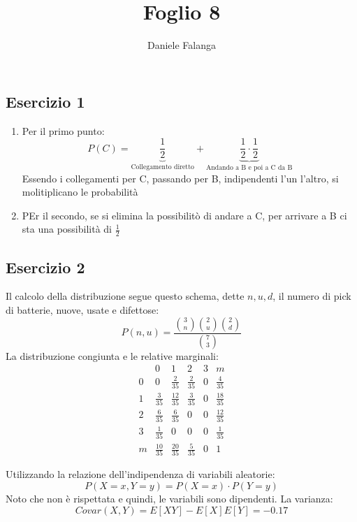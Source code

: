 \documentclass[12pt]{article}
\title{\textbf{Foglio 8}}
\author{Daniele Falanga}
\date{}
\begin{document}
\maketitle

\subsection*{Esercizio 1}

\begin{enumerate}
    \item Per il primo punto:
    \[
    P(C) = \underbrace{\frac{1}{2}}_{\text{Collegamento diretto}} + \underbrace{\frac{1}{2} \cdot \frac{1}{2}}_{\text{Andando a B e poi a C da B}}    
    \]
    Essendo i collegamenti per C, passando per B, indipendenti l'un l'altro, si molitiplicano le probabilità
    \item PEr il secondo, se si elimina la possibilitò di andare a C, per arrivare a B ci sta una possibilità di \(\frac{1}{2}\)
\end{enumerate}

\newpage
\subsection*{Esercizio 2}
Il calcolo della distribuzione segue questo schema, dette \(n,u,d\), il numero di pick di batterie, nuove, usate e difettose:
\[
P(n,u) = \frac{\binom{3}{n} \binom{2}{u} \binom{2}{d}}{\binom{7}{3}}    
\]
La distribuzione congiunta e le relative marginali:
\begin{equation*}
    \renewcommand{\arraystretch}{1.5}
    \begin{array}{c|cccc|c}
          & 0 & 1 & 2 & 3 & m\\
    \hline
    0 & 0 & \frac{2}{35} & \frac{2}{35} & 0 & \frac{4}{35}\\
    1 & \frac{3}{35} & \frac{12}{35} & \frac{3}{35} & 0 & \frac{18}{35} \\
    2 & \frac{6}{35} & \frac{6}{35} & 0 & 0 & \frac{12}{35}\\ 
    3 & \frac{1}{35} & 0 & 0 & 0 & \frac{1}{35}\\
    \hline
    m & \frac{10}{35} & \frac{20}{35} & \frac{5}{35} & 0 & 1 
    \end{array}
\end{equation*}

Utilizzando la relazione dell'indipendenza di variabili aleatorie:
\[
P(X=x,Y=y) = P(X=x)\cdot P(Y=y)    
\]
Noto che non è rispettata e quindi, le variabili sono dipendenti.
La varianza:
\[
Covar(X,Y) = E[XY] - E[X]E[Y] = -0.17    
\] 
\end{document}
